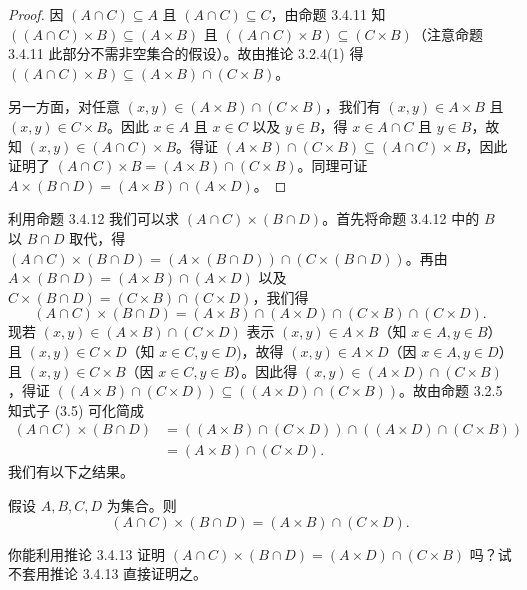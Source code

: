 \begin{proof}
因 $(A \cap C) \subseteq A$ 且 $(A \cap C) \subseteq C$，由命题 3.4.11 知 $((A \cap C) \times B) \subseteq (A \times B)$ 且 $((A \cap C) \times B) \subseteq (C \times B)$（注意命题 3.4.11 此部分不需非空集合的假设）。故由推论 3.2.4(1) 得 $((A \cap C) \times B) \subseteq (A \times B) \cap (C \times B)$。

另一方面，对任意 $(x, y) \in (A \times B) \cap (C \times B)$，我们有 $(x, y) \in A \times B$ 且 $(x, y) \in C \times B$。因此 $x \in A$ 且 $x \in C$ 以及 $y \in B$，得 $x \in A \cap C$ 且 $y \in B$，故知 $(x, y) \in (A \cap C) \times B$。得证 $(A \times B) \cap (C \times B) \subseteq (A \cap C) \times B$，因此证明了 $(A \cap C) \times B = (A \times B) \cap (C \times B)$。同理可证 $A \times (B \cap D) = (A \times B) \cap (A \times D)$。
\end{proof}

利用命题 3.4.12 我们可以求 $(A \cap C) \times (B \cap D)$。首先将命题 3.4.12 中的 $B$ 以 $B \cap D$ 取代，得 $(A \cap C) \times (B \cap D) = (A \times (B \cap D)) \cap (C \times (B \cap D))$。再由 $A \times (B \cap D) = (A \times B) \cap (A \times D)$ 以及 $C \times (B \cap D) = (C \times B) \cap (C \times D)$，我们得
\begin{equation}
(A \cap C) \times (B \cap D) = (A \times B) \cap (A \times D) \cap (C \times B) \cap (C \times D).
\end{equation}
现若 $(x, y) \in (A \times B) \cap (C \times D)$ 表示 $(x, y) \in A \times B$（知 $x \in A, y \in B$）且 $(x, y) \in C \times D$（知 $x \in C, y \in D$)，故得 $(x, y) \in A \times D$（因 $x \in A, y \in D$）且 $(x, y) \in C \times B$（因 $x \in C, y \in B$）。因此得 $(x, y) \in (A \times D) \cap (C \times B)$，得证 $((A \times B) \cap (C \times D)) \subseteq ((A \times D) \cap (C \times B))$。故由命题 3.2.5 知式子 (3.5) 可化简成
\[
\begin{aligned}
    (A \cap C) \times (B \cap D) &= ((A \times B) \cap (C \times D)) \cap ((A \times D) \cap (C \times B)) \\
    &= (A \times B) \cap (C \times D).
\end{aligned}
\]
我们有以下之结果。

\begin{corollary}
假设 $A, B, C, D$ 为集合。则
$$ (A \cap C) \times (B \cap D) = (A \times B) \cap (C \times D). $$
\end{corollary}

\begin{question}
你能利用推论 3.4.13 证明 $(A \cap C) \times (B \cap D) = (A \times D) \cap (C \times B)$ 吗？试不套用推论 3.4.13 直接证明之。
\end{question}


